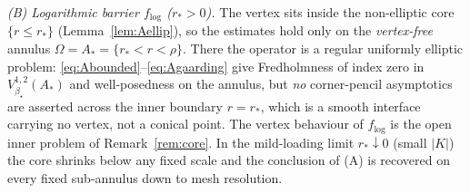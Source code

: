 \begin{theorem}
    \emph{(B) Logarithmic barrier $f_{\log}$ ($r_*>0$).} The vertex sits inside the non-elliptic core $\{r\le r_*\}$
    (Lemma~\ref{lem:Aellip}), so the estimates hold only on the \emph{vertex-free} annulus $\Omega=A_*=\{r_*<r<\rho\}$.
    There the operator is a regular uniformly elliptic problem: \eqref{eq:Abounded}--\eqref{eq:Agaarding} give
    Fredholmness of index zero in $V^{1,2}_{\beta_\star}(A_*)$ and well-posedness on the annulus, but \emph{no}
    corner-pencil asymptotics are asserted across the inner boundary $r=r_*$, which is a smooth interface carrying no
    vertex, not a conical point. The vertex behaviour of $f_{\log}$ is the open inner problem of Remark~\ref{rem:core}.
    In the mild-loading limit $r_*\downarrow0$ (small $|K|$) the core shrinks below any fixed scale and the conclusion
    of (A) is recovered on every fixed sub-annulus down to mesh resolution.
\end{theorem}

